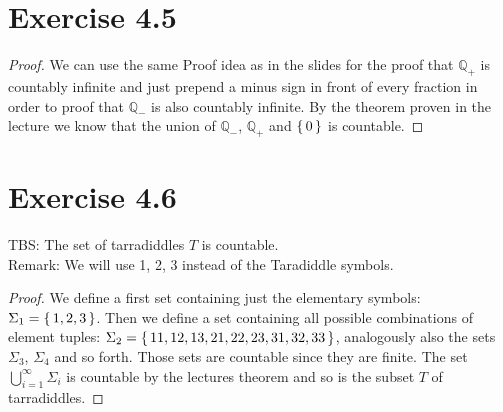 \documentclass{article} %
\newcommand{\homeworkNumber}{4}
\begin{document}
\section*{Exercise \homeworkNumber.5}

\begin{proof}
We can use the same Proof idea as in the slides for the proof that $\mathbb{Q}_+$ is countably infinite and just prepend a minus sign in front of every fraction in order to proof that $\mathbb{Q}_-$ is also countably infinite. By the theorem proven in the lecture we know that the union of $\mathbb{Q}_-$, $\mathbb{Q}_+$ and $\set{0}$ is countable.
\end{proof}

\newpage

\section*{Exercise \homeworkNumber.6}
TBS: The set of tarradiddles $T$ is countable.\\
Remark: We will use 1, 2, 3 instead of the Taradiddle symbols.
\begin{proof}
We define a first set containing just the elementary symbols: $\Sigma_1 = \set{1, 2, 3}$. Then we define a set containing all possible combinations of element tuples: $\Sigma_2 = \set{11, 12, 13, 21, 22, 23, 31, 32, 33}$, analogously also the sets $\Sigma_3$, $\Sigma_4$ and so forth. Those sets are countable since they are finite. The set $\bigcup_{i = 1}^\infty \Sigma_i$ is countable by the lectures theorem and so is the subset $T$ of tarradiddles.
\end{proof}
\end{document}

